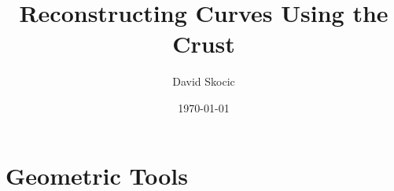 \documentclass{beamer}
\title{Reconstructing Curves Using the Crust}
\author{David Skocic}
\date{\today}
\begin{document}
\maketitle

\section{Geometric Tools}




\end{document}
